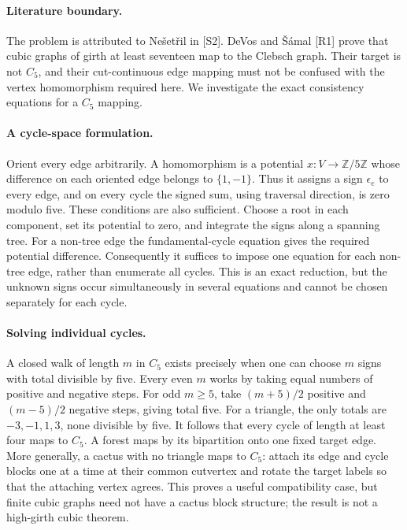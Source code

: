 \documentclass[11pt,a4paper]{article}
\begin{document}
\paragraph{Literature boundary.}
The problem is attributed to Nešetřil in [S2]. DeVos and Šámal [R1]
prove that cubic graphs of girth at least seventeen map to the Clebsch
graph. Their target is not $C_5$, and their cut-continuous edge mapping
must not be confused with the vertex homomorphism required here.
We investigate the exact consistency equations for a $C_5$ mapping.

\paragraph{A cycle-space formulation.}
Orient every edge arbitrarily. A homomorphism is a potential
$x:V\to\mathbb Z/5\mathbb Z$ whose difference on each oriented edge
belongs to $\{1,-1\}$. Thus it assigns a sign $\epsilon_e$ to every edge,
and on every cycle the signed sum, using traversal direction, is zero
modulo five. These conditions are also sufficient. Choose a root in each
component, set its potential to zero, and integrate the signs along a
spanning tree. For a non-tree edge the fundamental-cycle equation gives
the required potential difference. Consequently it suffices to impose
one equation for each non-tree edge, rather than enumerate all cycles.
This is an exact reduction, but the unknown signs occur simultaneously
in several equations and cannot be chosen separately for each cycle.

\paragraph{Solving individual cycles.}
A closed walk of length $m$ in $C_5$ exists precisely when one can choose
$m$ signs with total divisible by five. Every even $m$ works by taking
equal numbers of positive and negative steps. For odd $m\ge5$, take
$(m+5)/2$ positive and $(m-5)/2$ negative steps, giving total five.
For a triangle, the only totals are $-3,-1,1,3$, none divisible by five.
It follows that every cycle of length at least four maps to $C_5$.
A forest maps by its bipartition onto one fixed target edge.
More generally, a cactus with no triangle maps to $C_5$: attach its edge
and cycle blocks one at a time at their common cutvertex and rotate the
target labels so that the attaching vertex agrees. This proves a useful
compatibility case, but finite cubic graphs need not have a cactus block
structure; the result is not a high-girth cubic theorem.
\end{document}
